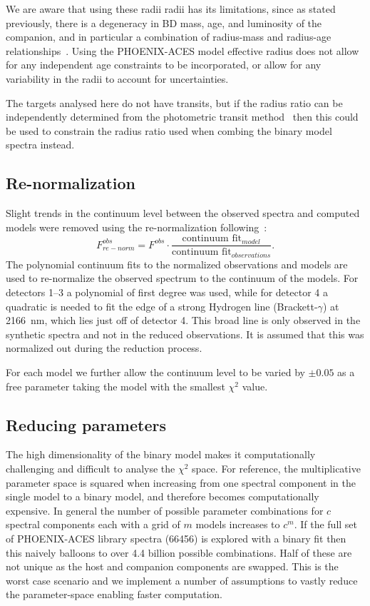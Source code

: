 \documentclass[fleqn,usenatbib]{mnras}
\begin{document}
We are aware that using these radii radii has its limitations, since as stated previously, there is a degeneracy in BD mass, age, and luminosity of the companion, and in particular a combination of radius-mass and radius-age relationships~\citep{sorahana_radii_2013}. Using the PHOENIX-ACES model effective radius does not allow for any independent age constraints to be incorporated, or allow for any variability in the radii to account for uncertainties.

The targets analysed here do not have transits, but if the radius ratio can be independently determined from the photometric transit method~\citep{deeg_photometric_1998} then this could be used to constrain the radius ratio used when combing the binary model spectra instead.

\subsection{Re-normalization}
\label{subsec:renorm}
Slight trends in the continuum level between the observed spectra and computed models were removed using the re-normalization following~\citep{passegger_fundamental_2016}:
\begin{equation}
F^{obs}_{re-norm} = F^{obs} \cdot \frac{\textrm{continuum fit}_{model}}{\textrm{continuum fit}_{observations}}.
\end{equation}
The polynomial continuum fits to the normalized observations and models are used to re-normalize the observed spectrum to the continuum of the models. For detectors 1--3 a polynomial of first degree was used, while for detector 4 a quadratic is needed to fit the edge of a strong Hydrogen line (Brackett-\(\gamma\)) at 2166~nm, which lies just off of detector 4. This broad line is only observed in the synthetic spectra and not in the reduced observations. It is assumed that this was normalized out during the reduction process.

For each model we further allow the continuum level to be varied by \(\pm 0.05\) as a free parameter taking the model with the smallest \(\chi^2\) value.

\subsection{Reducing parameters}
\label{subsec:reduce-params}
The high dimensionality of the binary model makes it computationally challenging and difficult to analyse the \(\chi^2\) space.
For reference, the multiplicative parameter space is squared when increasing from one spectral component in the single model to a binary model, and therefore becomes computationally expensive. In general the number of possible parameter combinations for \(c\) spectral components each with a grid of \(m\) models increases to \(c^m\). If the full set of PHOENIX-ACES library spectra (66456) is explored with a binary fit then this naively balloons to over 4.4 billion possible combinations. Half of these are not unique as the host and companion components are swapped. This is the worst case scenario and we implement a number of assumptions to vastly reduce the parameter-space enabling faster computation.
\end{document}
